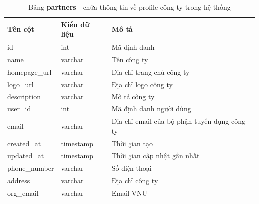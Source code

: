 \documentclass[./../main.tex]{subfiles}
\begin{document}
\begin{table}[H]
	\caption[Bảng partners]{Bảng \textbf{partners} - chứa thông tin về profile công ty trong hệ thống}
	\label{tab:db_partners}
	\begin{tabularx}{\textwidth}{|l|l|X|}
		\hline
		\textbf{Tên cột} & \textbf{Kiểu dữ liệu} & \textbf{Mô tả}                               \\ \hline
		id               & int                   & Mã định danh                                 \\ \hline
		name             & varchar               & Tên công ty                                  \\ \hline
		homepage\_url    & varchar               & Địa chỉ trang chủ công ty                    \\ \hline
		logo\_url        & varchar               & Địa chỉ logo công ty                         \\ \hline
		description      & varchar               & Mô tả công ty                                \\ \hline
		user\_id         & int                   & Mã định danh người dùng                      \\ \hline
		email            & varchar               & Địa chỉ email của bộ phận tuyển dụng công ty \\ \hline
		created\_at      & timestamp             & Thời gian tạo                                \\ \hline
		updated\_at      & timestamp             & Thời gian cập nhật gần nhất                  \\ \hline
		phone\_number    & varchar               & Số điện thoại                                \\ \hline
		address          & varchar               & Địa chỉ công ty                              \\ \hline
		org\_email       & varchar               & Email VNU                                    \\ \hline
	\end{tabularx}
\end{table}
\end{document}
